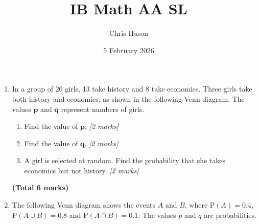 \documentclass[12pt, twoside]{article}
\title{IB Math AA SL}
\author{Chris Huson}
\date{5 February 2026}
\begin{document}
\begin{enumerate}

\subsubsection*{Do Now: Probability exam problems}

\item In a group of 20 girls, 13 take history and 8 take economics. Three girls take both history and
economics, as shown in the following Venn diagram. The values $\boldsymbol{p}$ and $\boldsymbol{q}$
represent numbers of girls.

\begin{center}
\end{center}

\begin{enumerate}[itemsep=2cm]
  \item Find the value of $\boldsymbol{p}$; \hfill \textit{[2 marks]}
  \item Find the value of $\boldsymbol{q}$. \hfill \textit{[2 marks]}
  \item A girl is selected at random. Find the probability that she takes
        economics but not history. \hfill \textit{[2 marks]}
\end{enumerate}

\vspace{1cm}
\noindent{}

\noindent\hfill \textbf{(Total 6 marks)}

\newpage

\item The following Venn diagram shows the events $A$ and $B$, where
$\mathrm{P}(A) = 0.4$, $\mathrm{P}(A \cup B) = 0.8$ and $\mathrm{P}(A \cap B) = 0.1$.
The values $p$ and $q$ are probabilities.

\begin{center}
\end{center}


\end{enumerate}
\end{document}
